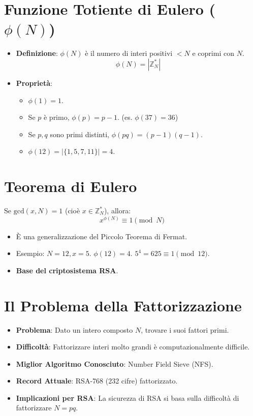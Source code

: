 \documentclass{article}
\begin{document}
\section{Funzione Totiente di Eulero ($\phi(N)$)}
\begin{itemize}
    \item \textbf{Definizione}: $\phi(N)$ è il numero di interi positivi $<N$ e coprimi con $N$.
    \[ \phi(N) = |\mathbb{Z}_N^*| \]
    \item \textbf{Proprietà}:
    \begin{itemize}
        \item $\phi(1)=1$.
        \item Se $p$ è primo, $\phi(p) = p-1$. (es. $\phi(37)=36$)
        \item Se $p, q$ sono primi distinti, $\phi(pq) = (p-1)(q-1)$.
        \item $\phi(12) = |\{1,5,7,11\}| = 4$.
    \end{itemize}
\end{itemize}

\section{Teorema di Eulero}
Se $\text{gcd}(x, N) = 1$ (cioè $x \in \mathbb{Z}_N^*$), allora:
\[ x^{\phi(N)} \equiv 1 \pmod N \]
\begin{itemize}
    \item È una generalizzazione del Piccolo Teorema di Fermat.
    \item Esempio: $N=12, x=5$. $\phi(12)=4$. $5^4 = 625 \equiv 1 \pmod{12}$.
    \item \textbf{Base del criptosistema RSA}.
\end{itemize}

\section{Il Problema della Fattorizzazione}
\begin{itemize}
    \item \textbf{Problema}: Dato un intero composto $N$, trovare i suoi fattori primi.
    \item \textbf{Difficoltà}: Fattorizzare interi molto grandi è computazionalmente difficile.
    \item \textbf{Miglior Algoritmo Conosciuto}: Number Field Sieve (NFS).
    \item \textbf{Record Attuale}: RSA-768 (232 cifre) fattorizzato.
    \item \textbf{Implicazioni per RSA}: La sicurezza di RSA si basa sulla difficoltà di fattorizzare $N=pq$.
\end{itemize}
\end{document}
